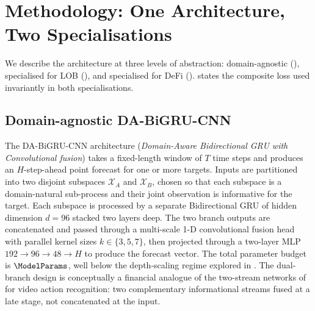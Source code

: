 \section{Methodology: One Architecture, Two Specialisations}
\label{sec:methodology}

We describe the architecture at three levels of abstraction:
domain-agnostic (), specialised for LOB
(), and specialised for DeFi
().   states the
composite loss used invariantly in both specialisations.

\subsection{Domain-agnostic DA-BiGRU-CNN}
\label{sec:methodology-abstract}

The DA-BiGRU-CNN architecture
(\emph{Domain-Aware Bidirectional GRU with Convolutional fusion}) takes
a fixed-length window of $T$ time steps and produces an
$H$-step-ahead point forecast for one or more targets.  Inputs are
partitioned into two disjoint subspaces $\mathcal{X}_A$ and
$\mathcal{X}_B$, chosen so that each subspace is a domain-natural
sub-process and their joint observation is informative for the target.
Each subspace is processed by a separate Bidirectional GRU
\cite{cho2014gru} of hidden dimension $d=96$ stacked two layers deep.
The two branch outputs are concatenated and passed through a multi-scale
1-D convolutional fusion head with parallel kernel sizes
$k \in \{3, 5, 7\}$, then projected through a two-layer MLP
$192 \to 96 \to 48 \to H$ to produce the forecast vector.  The total
parameter budget is $\ModelParams$, well below the depth-scaling regime
explored in \cite{briola2021deep, briola2025microstructure}.  The
dual-branch design is conceptually a financial analogue of the
two-stream networks of \cite{simonyan2014two} for video action
recognition: two complementary informational streams fused at a
late stage, not concatenated at the input.

